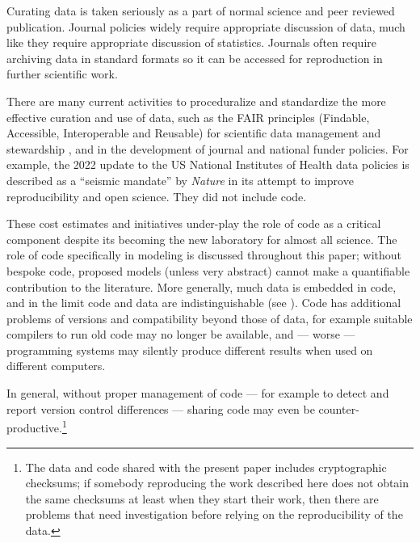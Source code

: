 \documentclass{comjnl}
\begin{document}
Curating data is taken seriously as a part of normal science and peer reviewed publication. Journal policies widely require appropriate discussion of data, much like they require appropriate discussion of statistics. Journals often require archiving data in standard formats so it can be accessed for reproduction in further scientific work. 

There are many current activities to proceduralize and standardize the more effective curation and use of data, such as the FAIR principles (Findable, Accessible, Interoperable and Reusable) for scientific data management and stewardship \cite{fair,fair-principles}, and in the development of journal and national funder policies. For example, the 2022 update to the US National Institutes of Health data policies \cite{nih-policy} is described as a ``seismic mandate'' by \emph{Nature\/} \cite{nih-nature} in its attempt to improve reproducibility and open science. They did not include code.

These cost estimates and initiatives under-play the role of code as a critical component despite its becoming the new laboratory for almost all science. The role of code specifically in modeling is discussed throughout this paper; without bespoke code, proposed models (unless very abstract) cannot make a quantifiable contribution to the literature. More generally, much data is embedded in code, and in the limit code and data are indistinguishable (see \supplement). Code has additional problems of versions and compatibility beyond those of data, for example suitable compilers to run old code may no longer be available, and --- worse --- programming systems may silently produce different results when used on different computers. 

In general, without proper management of code --- for example to detect and report version control differences --- sharing code may even be counter-productive.\footnote{The data and code shared with the present paper includes cryptographic checksums; if somebody reproducing the work described here does not obtain the same checksums at least when they start their work, then there are problems that need investigation before relying on the reproducibility of the data.}
\end{document}
